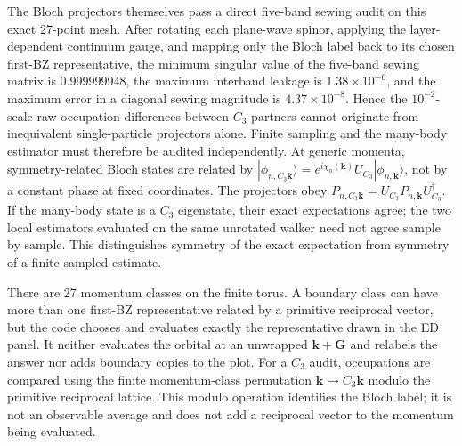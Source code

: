 The Bloch projectors themselves pass a direct five-band sewing audit on this
exact 27-point mesh. After rotating each plane-wave spinor, applying the
layer-dependent continuum gauge, and mapping only the Bloch label back to its
chosen first-BZ representative, the minimum singular value of the five-band
sewing matrix is 0.999999948, the maximum interband leakage is
$1.38\times10^{-6}$, and the maximum error in a diagonal sewing magnitude is
$4.37\times10^{-8}$. Hence the $10^{-2}$-scale raw occupation differences
between $C_3$ partners cannot originate from inequivalent single-particle
projectors alone. Finite sampling and the many-body estimator must therefore
be audited independently. At generic momenta, symmetry-related Bloch states
are related by $|\phi_{n,C_3\bm k}\rangle=e^{i\chi_n(\bm k)}
U_{C_3}|\phi_{n,\bm k}\rangle$, not by a constant phase at fixed coordinates.
The projectors obey $P_{n,C_3\bm k}=U_{C_3}P_{n,\bm k}U_{C_3}^\dagger$.
If the many-body state is a $C_3$ eigenstate, their exact expectations agree;
the two local estimators evaluated on the same unrotated walker need not
agree sample by sample. This distinguishes symmetry of the exact expectation
from symmetry of a finite sampled estimate.

There are 27 momentum classes on the finite torus. A boundary class can have
more than one first-BZ representative related by a primitive reciprocal
vector, but the code chooses and evaluates exactly the representative drawn in
the ED panel. It neither evaluates the orbital at an unwrapped $\bm k+\bm G$
and relabels the answer nor adds boundary copies to the plot. For a $C_3$
audit, occupations are compared using the finite momentum-class permutation
$\bm k\mapsto C_3\bm k$ modulo the primitive reciprocal lattice. This modulo
operation identifies the Bloch label; it is not an observable average and
does not add a reciprocal vector to the momentum being evaluated.

